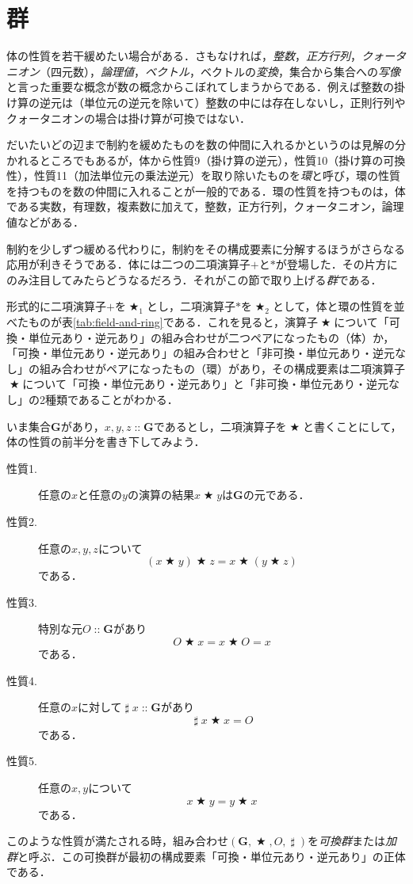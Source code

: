\documentclass[twocolumn]{jsbook}
\newcommand{\keyword}[1]{{\emph{#1}}}
\DeclareMathOperator{\mathAnyBinaryOperator}{\bigstar}
\DeclareMathOperator{\mathInverse}{\sharp}
\DeclareMathOperator{\mathIn}{::}
\newcommand{\mathSet}[1]{\mathbf{#1}}
\newcommand{\mathGroup}[4]{(#1,#2,#3,#4)}
\begin{document}
\section{群}

体の性質を若干緩めたい場合がある．さもなければ，\keyword{整数}，\keyword{正方行列}，\keyword{クォータニオン}（四元数），\keyword{論理値}，\keyword{ベクトル}，ベクトルの\keyword{変換}，集合から集合への\keyword{写像}と言った重要な概念が数の概念からこぼれてしまうからである．例えば整数の掛け算の逆元は（単位元の逆元を除いて）整数の中には存在しないし，正則行列やクォータニオンの場合は掛け算が可換ではない．

だいたいどの辺まで制約を緩めたものを数の仲間に入れるかというのは見解の分かれるところでもあるが，体から性質9（掛け算の逆元），性質10（掛け算の可換性），性質11（加法単位元の乗法逆元）を取り除いたものを\keyword{環}と呼び，環の性質を持つものを数の仲間に入れることが一般的である．環の性質を持つものは，体である実数，有理数，複素数に加えて，整数，正方行列，クォータニオン，論理値などがある．

制約を少しずつ緩める代わりに，制約をその構成要素に分解するほうがさらなる応用が利きそうである．体には二つの二項演算子$+$と$*$が登場した．その片方にのみ注目してみたらどうなるだろう．それがこの節で取り上げる\keyword{群}である．

形式的に二項演算子$+$を$\mathAnyBinaryOperator_1$とし，二項演算子$*$を$\mathAnyBinaryOperator_2$として，体と環の性質を並べたものが表\ref{tab:field-and-ring}である．これを見ると，演算子$\mathAnyBinaryOperator$について「可換・単位元あり・逆元あり」の組み合わせが二つペアになったもの（体）か，「可換・単位元あり・逆元あり」の組み合わせと「非可換・単位元あり・逆元なし」の組み合わせがペアになったもの（環）があり，その構成要素は二項演算子$\mathAnyBinaryOperator$について「可換・単位元あり・逆元あり」と「非可換・単位元あり・逆元なし」の2種類であることがわかる．

いま集合$\mathSet{G}$があり，$x,y,z\mathIn\mathSet{G}$であるとし，二項演算子を$\mathAnyBinaryOperator$と書くことにして，体の性質の前半分を書き下してみよう．
\begin{description}
\item[性質1.] 任意の$x$と任意の$y$の演算の結果$x\mathAnyBinaryOperator y$は$\mathSet{G}$の元である．
\item[性質2.] 任意の$x,y,z$について$$(x\mathAnyBinaryOperator y)\mathAnyBinaryOperator z=x\mathAnyBinaryOperator(y\mathAnyBinaryOperator z)$$である．
\item[性質3.] 特別な元$O\mathIn\mathSet{G}$があり$$O\mathAnyBinaryOperator x=x\mathAnyBinaryOperator O=x$$である．
\item[性質4.] 任意の$x$に対して$\mathInverse x\mathIn\mathSet{G}$があり$$\mathInverse x\mathAnyBinaryOperator x=O$$である．
\item[性質5.] 任意の$x,y$について$$x\mathAnyBinaryOperator y=y\mathAnyBinaryOperator x$$である．
\end{description}
このような性質が満たされる時，組み合わせ$\mathGroup{\mathSet{G}}{\mathAnyBinaryOperator}{O}{\mathInverse}$を\keyword{可換群}または\keyword{加群}と呼ぶ．この可換群が最初の構成要素「可換・単位元あり・逆元あり」の正体である．
\end{document}
